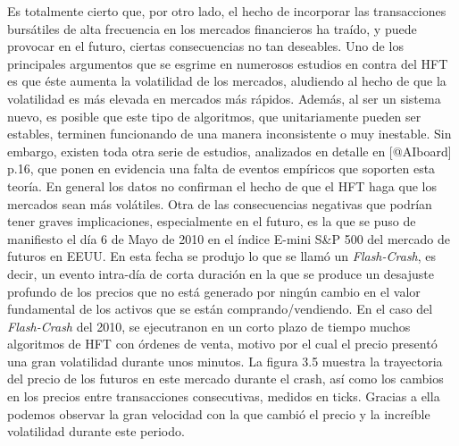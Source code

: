 \documentclass[]{article}
\begin{document}
Es totalmente cierto que, por otro lado, el hecho de incorporar las
transacciones bursátiles de alta frecuencia en los mercados financieros
ha traído, y puede provocar en el futuro, ciertas consecuencias no tan
deseables. Uno de los principales argumentos que se esgrime en numerosos
estudios en contra del HFT es que éste aumenta la volatilidad de los
mercados, aludiendo al hecho de que la volatilidad es más elevada en
mercados más rápidos. Además, al ser un sistema nuevo, es posible que
este tipo de algoritmos, que unitariamente pueden ser estables, terminen
funcionando de una manera inconsistente o muy inestable. Sin embargo,
existen toda otra serie de estudios, analizados en detalle en
{[}@AIboard{]} p.16, que ponen en evidencia una falta de eventos
empíricos que soporten esta teoría. En general los datos no confirman el
hecho de que el HFT haga que los mercados sean más volátiles. Otra de
las consecuencias negativas que podrían tener graves implicaciones,
especialmente en el futuro, es la que se puso de manifiesto el día 6 de
Mayo de 2010 en el índice E-mini S\&P 500 del mercado de futuros en
EEUU. En esta fecha se produjo lo que se llamó un \emph{Flash-Crash}, es
decir, un evento intra-día de corta duración en la que se produce un
desajuste profundo de los precios que no está generado por ningún cambio
en el valor fundamental de los activos que se están comprando/vendiendo.
En el caso del \emph{Flash-Crash} del 2010, se ejecutranon en un corto
plazo de tiempo muchos algoritmos de HFT con órdenes de venta, motivo
por el cual el precio presentó una gran volatilidad durante unos
minutos. La figura 3.5 muestra la trayectoria del precio de los futuros
en este mercado durante el crash, así como los cambios en los precios
entre transacciones consecutivas, medidos en ticks. Gracias a ella
podemos observar la gran velocidad con la que cambió el precio y la
increíble volatilidad durante este periodo.

\centering
\end{document}

